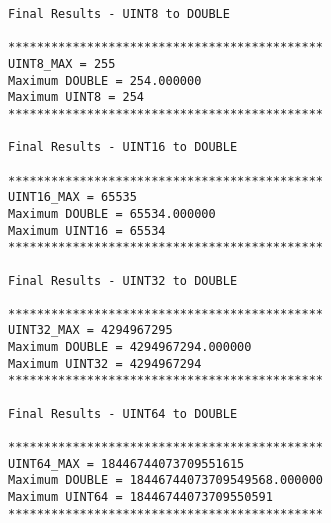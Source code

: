 \begin{verbatim}
Final Results - UINT8 to DOUBLE

********************************************
UINT8_MAX = 255
Maximum DOUBLE = 254.000000
Maximum UINT8 = 254
********************************************

Final Results - UINT16 to DOUBLE

********************************************
UINT16_MAX = 65535
Maximum DOUBLE = 65534.000000
Maximum UINT16 = 65534
********************************************

Final Results - UINT32 to DOUBLE

********************************************
UINT32_MAX = 4294967295
Maximum DOUBLE = 4294967294.000000
Maximum UINT32 = 4294967294
********************************************

Final Results - UINT64 to DOUBLE

********************************************
UINT64_MAX = 18446744073709551615
Maximum DOUBLE = 18446744073709549568.000000
Maximum UINT64 = 18446744073709550591
********************************************

\end{verbatim}
